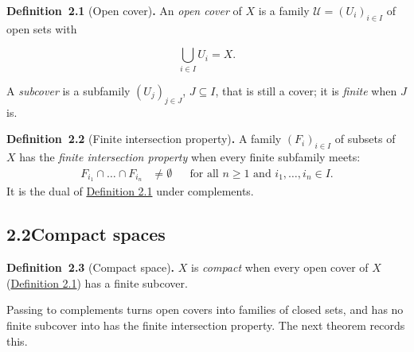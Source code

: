 \documentclass[11pt]{article}
\newenvironment{bpstatement}[2]{\par\addvspace{0.6\baselineskip}\noindent\textbf{#1}#2\textbf{.}\enspace\ignorespaces}
  {\par\addvspace{0.4\baselineskip}}
\providecommand{\fam}{}\renewcommand{\fam}[1]{\mathcal{#1}}
\begin{document}
\label{bp5}%
\begin{bpstatement}{Definition~2.1}{ (Open cover)}
An \emph{open cover} of \(X\) is a family \(\fam{U} = (U_i)_{i \in I}\) of open sets with

\[
\bigcup_{i \in I} U_i = X .
\]

A \emph{subcover} is a subfamily \((U_j)_{j \in J}\), \(J \subseteq I\), that is still a cover; it is \emph{finite} when \(J\) is.
\end{bpstatement}

\label{bp6}%
\begin{bpstatement}{Definition~2.2}{ (Finite intersection property)}
A family \((F_i)_{i \in I}\) of subsets of \(X\) has the \emph{finite intersection property} when every finite subfamily meets: \[
\begin{aligned}
F_{i_1} \cap \dots \cap F_{i_n} &\neq \emptyset
  &&\text{for all } n \ge 1 \text{ and } i_1, \dots, i_n \in I .
\end{aligned}
\] It is the dual of \hyperref[bp5]{Definition 2.1} under complements.
\end{bpstatement}


\subsection*{\texorpdfstring{2.2\quad Compact spaces}{2.2 Compact spaces}}
\label{bp7}%
\label{bp8}%
\begin{bpstatement}{Definition~2.3}{ (Compact space)}
\(X\) is \emph{compact} when every open cover of \(X\) (\hyperref[bp5]{Definition 2.1}) has a finite subcover.
\end{bpstatement}

\label{bp9}%
Passing to complements turns open covers into families of closed sets, and \textquotedbl{}has no finite subcover\textquotedbl{} into \textquotedbl{}has the finite intersection property\textquotedbl{}.  The next theorem records this.
\end{document}
